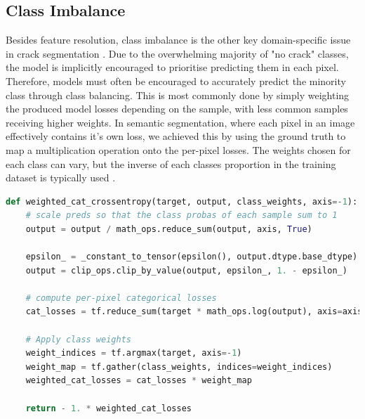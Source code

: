 \documentclass[a4paper,12pt]{report}
\begin{document}
\subsection{Class Imbalance}
Besides feature resolution, class imbalance is the other key domain-specific issue in crack segmentation \cite{hamishebahar_comprehensive_2022}. Due to the overwhelming majority of "no crack" classes, the model is implicitly encouraged to prioritise predicting them in each pixel. Therefore, models must often be encouraged to accurately predict the minority class through class balancing. This is most commonly done by simply weighting the produced model losses depending on the sample, with less common samples receiving higher weights. In semantic segmentation, where each pixel in an image effectively contains it's own loss, we achieved this by using the ground truth to map a multiplication operation onto the per-pixel losses. The weights chosen for each class can vary, but the inverse of each classes proportion in the training dataset is typically used \cite{kochkarev_data_2020}.

\hspace*{4mm}
\begin{lstlisting}[language=Python, caption=Weighted categorical crossentropy function in python using TensorFlow 2.1]
def weighted_cat_crossentropy(target, output, class_weights, axis=-1):
    # scale preds so that the class probas of each sample sum to 1
    output = output / math_ops.reduce_sum(output, axis, True)

    epsilon_ = _constant_to_tensor(epsilon(), output.dtype.base_dtype)
    output = clip_ops.clip_by_value(output, epsilon_, 1. - epsilon_)

    # compute per-pixel categorical losses
    cat_losses = tf.reduce_sum(target * math_ops.log(output), axis=axis)
    
    # Apply class weights
    weight_indices = tf.argmax(target, axis=-1)
    weight_map = tf.gather(class_weights, indices=weight_indices)
    weighted_cat_losses = cat_losses * weight_map
    
    return - 1. * weighted_cat_losses
\end{lstlisting}
\end{document}
